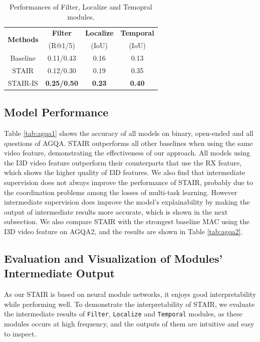 \documentclass[letterpaper]{article} %
\begin{document}
\begin{table}[t]
    \centering
    \setlength{\abovecaptionskip}{5pt}
    \setlength{\tabcolsep}{4pt}
    \begin{tabular}{c|ccc}
    \hline
    \multirow{2}{*}{\textbf{Methods}} & \textbf{Filter} & \textbf{Localize} & \textbf{Temporal} \\
     & (R@1/5) & (IoU) & (IoU) \\
    \hline
    Baseline & 0.11/0.43 & 0.16 & 0.13 \\
    STAIR & 0.12/0.30 & 0.19 & 0.35 \\
    STAIR-IS & \textbf{0.25/0.50} & \textbf{0.23} & \textbf{0.40} \\
    \hline
    \end{tabular}
    \caption{Performances of Filter, Localize and Temopral modules.}
    \label{tab:interpret}
\end{table}

\subsection{Model Performance}
Table \ref{tab:agqa1} shows the accuracy of all models on binary, open-ended and all questions of AGQA. STAIR outperforms all other baselines when using the same video feature, demonstrating the effectiveness of our approach. All models using the I3D video feature outperform their counterparts that use the RX feature, which shows the higher quality of I3D features. We also find that intermediate supervision does not always improve the performance of STAIR, probably due to the coordination problems among the losses of multi-task learning. However intermediate supervision does improve the model's explainability by making the output of intermediate results more accurate, which is shown in the next subsection. We also compare STAIR with the strongest baseline MAC using the I3D video feature on AGQA2, and the results are shown in Table \ref{tab:agqa2}.

\subsection{Evaluation and Visualization of Modules' Intermediate Output}
As our STAIR is based on neural module networks, it enjoys good interpretability while performing well. 
To demonstrate the interpretability of STAIR, we evaluate the intermediate results of \texttt{Filter}, \texttt{Localize} and \texttt{Temporal} modules, as these modules occurs at high frequency, and the outputs of them are intuitive and easy to inspect.
\end{document}
